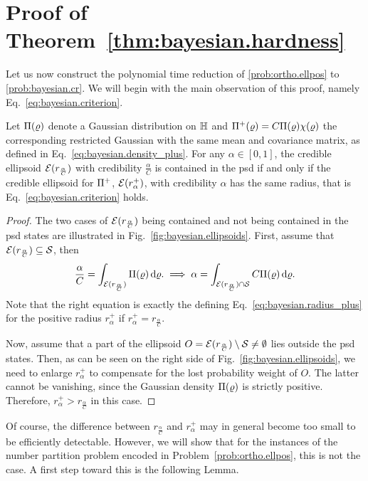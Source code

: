 \section{Proof of Theorem~\ref{thm:bayesian.hardness}}
\label{sec:error.proof_bayesian}

Let us now construct the polynomial time reduction of \cref{prob:ortho.ellpos} to \cref{prob:bayesian.cr}.
We will begin with the main observation of this proof, namely Eq.~\eqref{eq:bayesian.criterion}.
\begin{lemma}\label{lem:bayesian.criterion}
  Let $\Pi(\varrho)$ denote a Gaussian distribution on $\mathbb{H}$ and $\Pi^+(\varrho) = C \Pi(\varrho) \chi(\varrho)$ the corresponding restricted Gaussian with the same mean and covariance matrix, as defined in Eq.~\eqref{eq:bayesian.density_plus}.
  For any $\alpha \in [0,1]$, the credible ellipsoid $\mathcal{E}(r_\frac{\alpha}{C})$ with credibility $\frac{\alpha}{C}$ is contained in the psd if and only if the credible ellipsoid for $\Pi^+$, $\mathcal{E}(r^+_{\alpha})$, with credibility $\alpha$ has the same radius, that is Eq.~\eqref{eq:bayesian.criterion} holds.
\end{lemma}
\begin{proof}
  The two cases of  $\mathcal{E}(r_\frac{\alpha}{C})$ being contained and not being contained in the psd states are illustrated in Fig.~\ref{fig:bayesian.ellipsoids}.
  First, assume that $\mathcal{E}(r_\frac{\alpha}{C}) \subseteq \mathcal{S}$, then
  \[
    \frac{\alpha}{C} = \int_{\mathcal{E}(r_\frac{\alpha}{C})} \Pi(\varrho) \, \mathrm{d} \varrho.
    \implies
    \alpha = \int_{\mathcal{E}(r_\frac{\alpha}{C}) \cap \mathcal{S} } C \Pi(\varrho) \, \mathrm{d} \varrho.
  \]
  Note that the right equation is exactly the defining Eq.~\eqref{eq:bayesian.radius_plus} for the positive radius $r^+_{\alpha}$ if $r^+_\alpha = r_\frac{\alpha}{C}$.

  Now, assume that a part of the ellipsoid $O = \mathcal{E}(r_\frac{\alpha}{C})  \setminus \mathcal{S} \neq \emptyset$ lies outside the psd states.
  Then, as can be seen on the right side of Fig.~\ref{fig:bayesian.ellipsoids}, we need to enlarge $r^+_{\alpha}$ to compensate for the lost probability weight of $O$.
  The latter cannot be vanishing, since the Gaussian density $\Pi(\varrho)$ is strictly positive.
  Therefore, $r^+_\alpha > r_\frac{\alpha}{C}$ in this case.
\end{proof}
Of course, the difference between $r_\frac{\alpha}{C}$ and $r^+_{\alpha}$ may in general become too small to be efficiently detectable.
However, we will show that for the instances of the number partition problem encoded in Problem~\ref{prob:ortho.ellpos}, this is not the case.
A first step toward this is the following Lemma.

